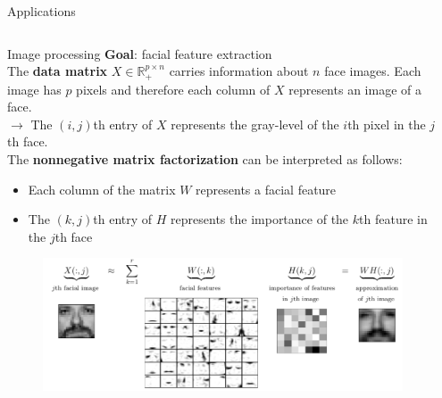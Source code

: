 \documentclass[final]{beamer}
\newlength{\onecolwid}
\newlength{\threecolwid}
\newcommand{\real}{\mathbb{R}}
\begin{document}
\begin{frame}
\begin{columns}[t]
\begin{column}{\threecolwid}
\begin{exampleblock}{Applications}
\vspace{-0.8cm}
\begin{columns}[t]
\begin{column}{\onecolwid}
\begin{block}{Image processing}
\textbf{Goal}: facial feature extraction\\
The \textbf{data matrix} $X\in\real^{p\times n}_+$ carries information about $n$ face images. Each image has $p$ pixels and therefore each column of $X$ represents an image of a face.\\
$\rightarrow$ The $(i,j)$th entry of $X$ represents the gray-level of the $i$th pixel in the $j$th face.\\
The \textbf{nonnegative matrix factorization} can be interpreted as follows:\\
\begin{itemize}
    \item Each column of the matrix $W$ represents a facial feature
    \item The $(k,j)$th entry of $H$ represents the importance of the $k$th feature in the $j$th face
\end{itemize}
\begin{figure}
    \centering
    \includegraphics{../images/NMF_app1.png}
\end{figure}
\end{block}
\end{column}
\begin{column}{\onecolwid}


\end{column}
\end{columns}
\end{exampleblock}
\end{column}
\end{columns}
\end{frame}
\end{document}

